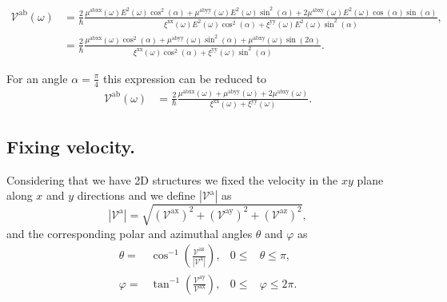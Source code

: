 \documentclass[prb,11pt,tightenlines,twocolumn,aps]{revtex4-1}
\begin{document}
\begin{widetext}
\begin{align}
\mathcal{V}^{\mathrm{ab}} (\omega) 
&= \frac{2}{\hbar}
\frac{\mu^{\mathrm{abxx}}(\omega)
E^{2}(\omega)\cos^{2}(\alpha) + 
\mu^{\mathrm{abyy}}(\omega)
E^{2}(\omega)\sin^{2}(\alpha) + 
2\mu^{\mathrm{abxy}}(\omega)
E^{2}(\omega)\cos(\alpha)\sin(\alpha)}
{\xi^{\mathrm{xx}}(\omega)
E^{2}(\omega)\cos^{2}(\alpha) + 
\xi^{\mathrm{yy}}(\omega)
E^{2}(\omega)\sin^{2}(\alpha)},
\nonumber \\
&= \frac{2}{\hbar}
\frac{\mu^{\mathrm{abxx}}(\omega)\cos^{2}(\alpha) + 
\mu^{\mathrm{abyy}}(\omega)\sin^{2}(\alpha) + 
\mu^{\mathrm{abxy}}(\omega)\sin(2\alpha)}
{\xi^{\mathrm{xx}}(\omega)\cos^{2}(\alpha) + 
\xi^{\mathrm{yy}}(\omega)\sin^{2}(\alpha)}.
\label{eq:vab}
\end{align}
\end{widetext}

For an angle $\alpha = \frac{\pi}{4}$ this expression can be reduced to 
\begin{align}
\mathcal{V}^{\mathrm{ab}} (\omega)
&= \frac{2}{\hbar}
\frac{\mu^{\mathrm{abxx}}(\omega) + \mu^{\mathrm{abyy}}(\omega) + 
2\mu^{\mathrm{abxy}}(\omega)}
{\xi^{\mathrm{xx}}(\omega) + \xi^{\mathrm{yy}}(\omega)}.
\label{eq:vab-90deg}
\end{align}


\subsection{Fixing velocity.}\label{sec:theory-fixvel}
Considering that we have 2D structures we fixed the velocity in the $xy$ plane
along $x$ and $y$ directions and we define $|\mathcal{V}^{\mathrm{a}}|$ as
\begin{equation}\label{eq:va-mag}
|\mathcal{V}^{\mathrm{a}}| = 
\sqrt {
(\mathcal{V}^{\mathrm{ax}})^{2} +
(\mathcal{V}^{\mathrm{ay}})^{2} +
(\mathcal{V}^{\mathrm{az}})^{2} 
},
\end{equation}
and the corresponding polar and azimuthal angles $\theta$ and $\varphi$ as
\begin{align}
\theta  =& \cos^{-1} \left( \frac{\mathcal{V}^{\mathrm{az}}}
{|\mathcal{V}^{\mathrm{a}}|} \right),
& 0 \leq &\theta \leq \pi, 
\label{eq:polar-ang}
\\
\varphi =& \tan^{-1} \left( \frac{\mathcal{V}^{\mathrm{ay}}}
{\mathcal{V}^{\mathrm{ax}}} \right),
& 0 \leq &\varphi \leq 2\pi.
\label{eq:azimuthal-ang} 
\end{align}
\end{document}
